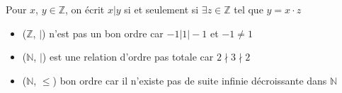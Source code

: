 \begin{example}
	Pour $x$, $y \in \mathbb{Z}$, on écrit $x | y$ si et seulement si $\exists z \in \mathbb{Z}$ tel que $y = x\cdot z$
	\begin{itemize}
		\item ($\mathbb{Z}$, $|$) n'est pas un bon ordre car $-1 | 1 | -1$ et $-1 \neq 1$
		\item ($\mathbb{N}$, $|$) est une relation d'ordre pas totale car $2 \nmid 3 \nmid 2$
		\item ($\mathbb{N}$, $\leqslant$) bon ordre car il n'existe pas de suite infinie décroissante dans $\mathbb{N}$
	\end{itemize}
\end{example}


